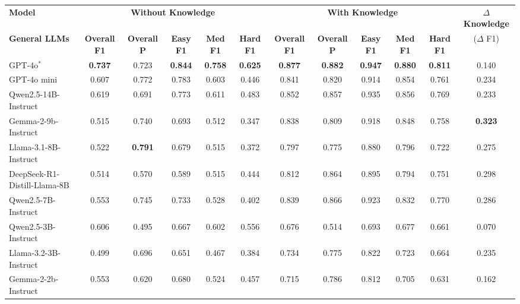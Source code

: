 


\begin{table*}[t]
    \centering
    \renewcommand{\arraystretch}{1.2}
    \begin{adjustbox}{width=1\linewidth, center}
    \begin{tabular}{lccccc|ccccc|c}
    \toprule
    \textbf{Model} & \multicolumn{5}{c|}{\textbf{Without Knowledge}} & \multicolumn{5}{c|}{\textbf{With Knowledge}} & \textbf{$\Delta$ Knowledge} \\
    \cmidrule(lr){1-6} \cmidrule(lr){7-11}
    \textbf{General LLMs} & \textbf{Overall F1} & \textbf{Overall P} & \textbf{Easy F1} & \textbf{Med F1} & \textbf{Hard F1} 
                   & \textbf{Overall F1} & \textbf{Overall P} & \textbf{Easy F1} & \textbf{Med F1} & \textbf{Hard F1} & ($\Delta$ F1)\\
    \cmidrule(lr){2-6} \cmidrule(lr){7-12}
    GPT-4o$^*$                       & \textbf{0.737} & 0.723 & \textbf{0.844} & \textbf{0.758} & \textbf{0.625} & \textbf{0.877} & \textbf{0.882} & \textbf{0.947} & \textbf{0.880} & \textbf{0.811} & 0.140 \\
    GPT-4o mini                  & 0.607 & 0.772 & 0.783 & 0.603 & 0.446 & 0.841 & 0.820 & 0.914 & 0.854 & 0.761 & 0.234 \\
    Qwen2.5-14B-Instruct         & 0.619 & 0.691 & 0.773 & 0.611 & 0.483 & 0.852 & 0.857 & 0.935 & 0.856 & 0.769 & 0.233 \\
    Gemma-2-9b-Instruct          & 0.515 & 0.740 & 0.693 & 0.512 & 0.347 & 0.838 & 0.809 & 0.918 & 0.848 & 0.758 & \textbf{0.323} \\
    Llama-3.1-8B-Instruct        & 0.522 & \textbf{0.791} & 0.679 & 0.515 & 0.372 & 0.797 & 0.775 & 0.880 & 0.796 & 0.722 & 0.275 \\
    DeepSeek-R1-Distill-Llama-8B & 0.514 & 0.570 & 0.589 & 0.515 & 0.444 & 0.812 & 0.864 & 0.895 & 0.794 & 0.751 & 0.298 \\
    Qwen2.5-7B-Instruct          & 0.553 & 0.745 & 0.733 & 0.528 & 0.402 & 0.839 & 0.866 & 0.923 & 0.832 & 0.770 & 0.286 \\
    Qwen2.5-3B-Instruct          & 0.606 & 0.495 & 0.667 & 0.602 & 0.556 &  0.676 & 0.514 & 0.693 & 0.677 & 0.661 & 0.070 \\
    Llama-3.2-3B-Instruct                  & 0.499 & 0.696 & 0.651 & 0.467 & 0.384 & 0.734 & 0.775 & 0.822 & 0.723 & 0.664 & 0.235 \\
    Gemma-2-2b-Instruct                   & 0.553 & 0.620 & 0.680 & 0.524 & 0.457 & 0.715 & 0.786 & 0.812 & 0.705 & 0.631 & 0.162 \\
    

\end{tabular}
\end{adjustbox}
\end{table*}
